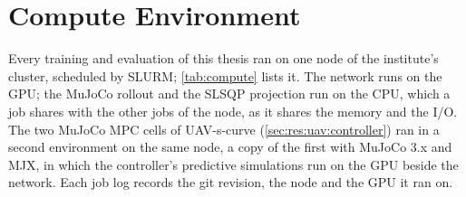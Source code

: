\chapter{Compute Environment}\label{app:repro}\label{app:compute}

Every training and evaluation of this thesis ran on one node of the institute's cluster, scheduled by
SLURM; \autoref{tab:compute} lists it. The network runs on the GPU; the MuJoCo rollout and the SLSQP
projection run on the CPU, which a job shares with the other jobs of the node, as it shares the memory
and the I/O. The two MuJoCo MPC cells of UAV-s-curve (\autoref{sec:res:uav:controller}) ran in a
second environment on the same node, a copy of the first with MuJoCo 3.x and MJX, in which the
controller's predictive simulations run on the GPU beside the network. Each job log records the git
revision, the node and the GPU it ran on.

